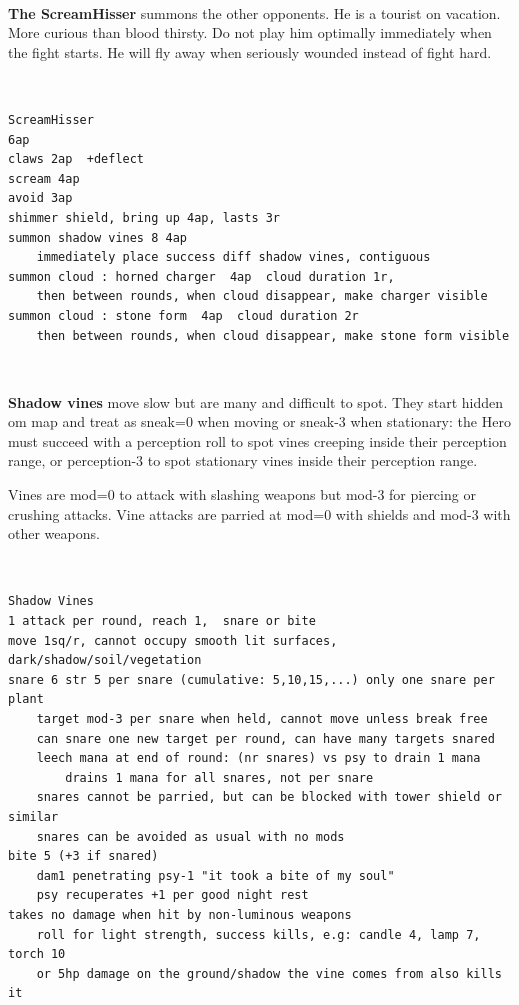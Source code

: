 \

\textbf{The ScreamHisser} summons the other opponents. He is a tourist on vacation. More curious than blood thirsty. Do not play him optimally immediately when the fight starts. He will fly away when seriously wounded instead of fight hard.

\

\begin{samepage} \small \begin{verbatim}
ScreamHisser
6ap
claws 2ap  +deflect
scream 4ap
avoid 3ap
shimmer shield, bring up 4ap, lasts 3r
summon shadow vines 8 4ap
    immediately place success diff shadow vines, contiguous
summon cloud : horned charger  4ap  cloud duration 1r,
    then between rounds, when cloud disappear, make charger visible
summon cloud : stone form  4ap  cloud duration 2r
    then between rounds, when cloud disappear, make stone form visible
\end{verbatim} \normalsize \end{samepage}

\

\goodbreak
\textbf{Shadow vines} move slow but are many and difficult to spot. They start hidden om map and treat as sneak=0 when moving or sneak-3 when stationary: the Hero must succeed with a perception roll to spot vines creeping inside their perception range, or perception-3 to spot stationary vines inside their perception range.

Vines are mod=0 to attack with slashing weapons but mod-3 for piercing or crushing attacks. Vine attacks are parried at mod=0 with shields and mod-3 with other weapons.

\

\begin{samepage}
\small \begin{verbatim}
Shadow Vines
1 attack per round, reach 1,  snare or bite
move 1sq/r, cannot occupy smooth lit surfaces, dark/shadow/soil/vegetation
snare 6 str 5 per snare (cumulative: 5,10,15,...) only one snare per plant
    target mod-3 per snare when held, cannot move unless break free
    can snare one new target per round, can have many targets snared
    leech mana at end of round: (nr snares) vs psy to drain 1 mana
        drains 1 mana for all snares, not per snare
    snares cannot be parried, but can be blocked with tower shield or similar
    snares can be avoided as usual with no mods
bite 5 (+3 if snared)
    dam1 penetrating psy-1 "it took a bite of my soul"
    psy recuperates +1 per good night rest
takes no damage when hit by non-luminous weapons
    roll for light strength, success kills, e.g: candle 4, lamp 7, torch 10
    or 5hp damage on the ground/shadow the vine comes from also kills it
\end{verbatim} \normalsize
\end{samepage}

